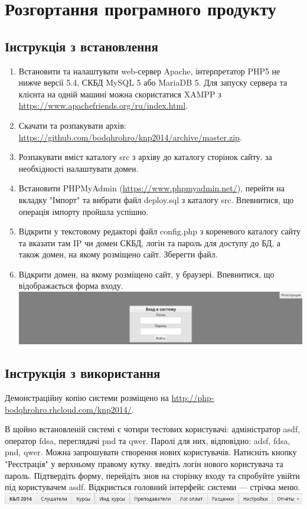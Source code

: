 \section{Розгортання програмного продукту}
\subsection{Інструкція з встановлення}
\begin{sloppy}
\begin{enumerate}
\item Встановити та налаштувати web-сервер Apache, інтерпретатор PHP5 не нижче версії 5.4, СКБД MySQL 5 або MariaDB 5. Для запуску сервера та клієнта на одній машині можна скористатися XAMPP з \url{https://www.apachefriends.org/ru/index.html}.
\item Скачати та розпакувати архів: \url{https://github.com/bodqhrohro/knp2014/archive/master.zip}.
\item Розпакувати вміст каталогу src з архіву до каталогу сторінок сайту. за необхідності налаштувати домен.
\item Встановити PHPMyAdmin (\url{https://www.phpmyadmin.net/}), перейти на вкладку "Імпорт" та вибрати файл deploy.sql з каталогу src. Впевнитися, що операція імпорту пройшла успішно.
\item Відкрити у текстовому редакторі файл config.php з кореневого каталогу сайту та вказати там IP чи домен СКБД, логін та пароль для доступу до БД, а також домен, на якому розміщено сайт. Зберегти файл.
\item Відкрити домен, на якому розміщено сайт, у браузері. Впевнитися, що відображається форма входу.\\\includegraphics[width=17cm]{scrns/login.png}
\end{enumerate}
\end{sloppy}
\subsection{Інструкція з використання}
Демонстраційну копію системи розміщено на \url{http://php-bodqhrohro.rhcloud.com/knp2014/}.

В щойно встановленій системі є чотири тестових користувачі: адміністратор asdf, оператор fdsa, переглядачі pnd та qwer. Паролі для них, відповідно: adsf, fdsa, pnd, qwer. Можна запрошувати створення нових користувачів. Натисніть кнопку "Реєстрація" у верхньому правому кутку. введіть логін нового користувача та пароль. Підтвердіть форму, перейдіть знов на сторінку входу та спробуйте увійти під користувачем asdf. Відкриється головний інтерфейс системи --- стрічка меню.
\\\includegraphics[width=17cm]{scrns/menu.png}

